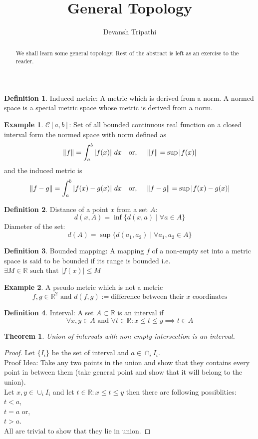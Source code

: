 \documentclass[12pt,reqno]{amsart}
\title{General Topology}
\author{Devansh Tripathi}
\theoremstyle{plain}
\newtheorem{thm}{Theorem}
\theoremstyle{definition}
\newtheorem{defn}{Definition}
\newtheorem{eg}{Example}
\begin{document}
\begin{abstract}
    We shall learn some general topology. Rest of the abstract is left as an exercise to the reader.
\end{abstract}
\maketitle
\newpage
\begin{defn}
    Induced metric: A metric which is derived from a norm. A normed space is a special metric space whose metric is derived from a norm.
\end{defn}
\begin{eg}
    $\mathscr{C}[a,b]$: Set of all bounded continuous real function on a closed interval form the normed space with norm defined as $$ \|f\| = \int_a^b |f(x)|~dx \hspace{0.35cm}\text{or,} \hspace{0.5cm} \|f\| = \sup{|f(x)|}$$ and the induced metric is $$ \|f - g \| = \int_a^b |f(x) - g(x)| ~ dx \hspace{0.35cm} \text{or,} \hspace{0.5cm} \|f - g\| = \sup{|f(x) - g(x)|} $$
\end{eg}
\begin{defn}
    Distance of a point $x$ from a set $A$: $$ d(x, A) = \inf\{d(x,a) \mid \forall a \in A \} $$
    Diameter of the set: $$ d(A) = \sup \{d(a_1, a_2) \mid \forall a_1, a_2 \in A\} $$
\end{defn}
\begin{defn}
    Bounded mapping: A mapping $f$ of a non-empty set into a metric space is said to be bounded if its range is bounded i.e. $\exists M \in \mathbb{R} \text{ such that } |f(x)| \leq M $ 
\end{defn}
\begin{eg}
    A pseudo metric which is not a metric
    $$ f,g \in \mathbb{R}^2 \text{ and } d(f,g):= \text{difference between their $x$ coordinates} $$    
\end{eg}
\begin{defn}
    Interval: A set $A \subset \mathbb{R}$ is an interval if $$ \forall x, y \in A \text{ and } \forall t \in \mathbb{R} \colon x \leq t \leq y \implies t \in A $$ 
\end{defn}
\begin{thm}
    Union of intervals with non empty intersection is an interval.    
\end{thm}
\begin{proof}
    Let $\{I_i\}$ be the set of interval and $a \in \cap_i I_i$.\\
    Proof Idea: Take any two points in the union and show that they contains every point in between them (take general point and show that it will belong to the union).\\
    Let $x,y \in \cup_i I_i$ and let $t \in \mathbb{R} \colon x \leq t \leq y $ then there are following possiblities:\\
    $t < a$, \\$ t = a$ or, \\ $t > a$.\\ All are trivial to show that they lie in union.
\end{proof}
\end{document}
